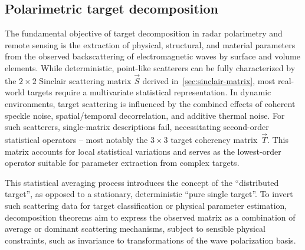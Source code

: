 \subsection{Polarimetric target decomposition}
\label{sec:target-decomposition}

The fundamental objective of target decomposition in radar polarimetry and remote sensing is the extraction of physical, structural, and material parameters from the observed backscattering of electromagnetic waves by surface and volume elements.
While deterministic, point-like scatterers can be fully characterized by the $2 \times 2$ Sinclair scattering matrix $\vec S$ derived in~\cref{sec:sinclair-matrix}, most real-world targets require a multivariate statistical representation.
In dynamic environments, target scattering is influenced by the combined effects of coherent speckle noise, spatial/temporal decorrelation, and additive thermal noise.
For such scatterers, single-matrix descriptions fail, necessitating second-order statistical operators -- most notably the $3 \times 3$ target coherency matrix~$\vec T$.
This matrix accounts for local statistical variations and serves as the lowest-order operator suitable for parameter extraction from complex targets.

This statistical averaging process introduces the concept of the \enquote{distributed target}, as opposed to a stationary, deterministic \enquote{pure single target}.
To invert such scattering data for target classification or physical parameter estimation, decomposition theorems aim to express the observed matrix as a combination of average or dominant scattering mechanisms, subject to sensible physical constraints, such as invariance to transformations of the wave polarization basis.

